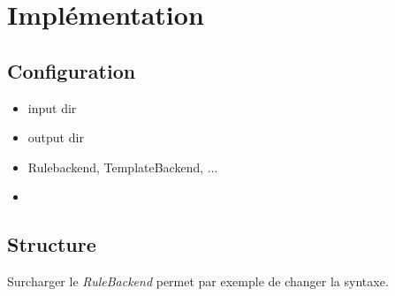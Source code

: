 \section{Implémentation}

	\subsection{Configuration}
	
		\begin{itemize}
			\item input dir
			\item output dir
			\item Rulebackend, TemplateBackend, ...
			\item 
		\end{itemize}
	
	\subsection{Structure}

		Surcharger le \textit{RuleBackend} permet par exemple de changer la syntaxe.